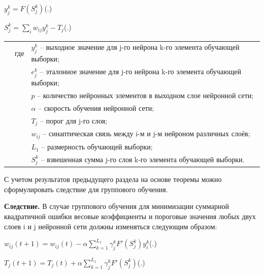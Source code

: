 {		\formulaspace \par \redline 
	$y_{j}^{k} = F(S_{j}^{k}) $\hfill (\thechaptercntr .\theformulacntr) \redline
	\formulaspace \addtocounter{formulacntr}{1}
	
		\formulaspace \par \redline 
	$S_{j}^{k} = \sum \limits _{i}^{} w_{ij}y_{j}^{k} - T_{j}$\hfill (\thechaptercntr .\theformulacntr) \redline
	\formulaspace \addtocounter{formulacntr}{1}
	
	\begin{tabular}{p{}p{}p{}}
		& где  & $y_{j}^{k}$ {--} выходное значение для j-го нейрона k-го элемента обучающей выборки; \\
		&      & $e_{j}^{k}$ {--} эталонное значение для j-го нейрона k-го элемента обучающей выборки; \\
		&      & $p $ {--} количество нейронных элементов в выходном слое нейронной сети; \\
		&      & $\alpha$ {--} скорость обучения нейронной сети; \\
		&      & $T_{j}$ {--} порог для j-го слоя; \\
		&      & $w_{ij}$ {--} синаптическая связь между i-м и j-м нейроном различных слоёв; \\
		&      & $L_1$ {--} размерность обучающей выборки; \\
		&      & $S_{j}^{k}$ {--} взвешенная сумма j-го слоя k-го элемента обучающей выборки. \\
	\end{tabular}
	
	\par \redline С учетом результатов предыдущего раздела на основе теоремы можно сформулировать следствие для группового обучения.
	
	\par \redline \textbf{Следствие.} В случае группового обучения для минимизации суммарной квадратичной ошибки весовые коэффициенты и пороговые значения любых двух слоев i и j нейронной сети должны изменяться следующим образом:
	
	\formulaspace \par \redline 
	$w_{ij}(t+1) = w_{ij}(t) - \alpha \sum \limits _{k=1}^{L_1} \gamma_{j}^{k} F'(S_{j}^{k})  y_{i}^{k}$\hfill (\thechaptercntr .\theformulacntr) \redline
	\formulaspace \addtocounter{formulacntr}{1}
	
	\formulaspace \par \redline 
	$T_{j}(t+1) = T_{j}(t) + \alpha \sum \limits _{k=1}^{L_1} \gamma_{j}^{k} F'(S_{j}^{k}) $\hfill (\thechaptercntr .\theformulacntr) \redline
	\formulaspace \addtocounter{formulacntr}{1}
	
}
